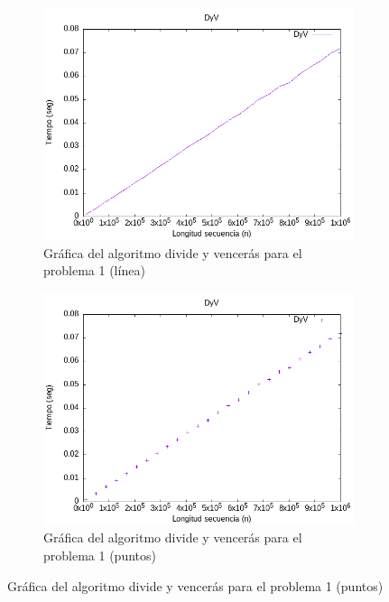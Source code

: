\documentclass{article}
\begin{document}
\begin{figure}[H]
    \centering
    \begin{subfigure}[b]{0.4\textwidth}
        \centering
        \includegraphics[width=\textwidth]{P1/p1_dyv_lines.png}
        \caption{\centering Gráfica del algoritmo divide y vencerás para el problema 1 (línea)}
        \label{fig:p1_dyv_line}
    \end{subfigure}
    \begin{subfigure}[b]{0.4\textwidth}
        \centering
        \includegraphics[width=\textwidth]{P1/p1_dyv_points.png}
        \caption{\centering Gráfica del algoritmo divide y vencerás para el problema 1 (puntos)}
        \label{fig:p1_dyv_point}
    \end{subfigure}
\end{figure}
\end{document}
